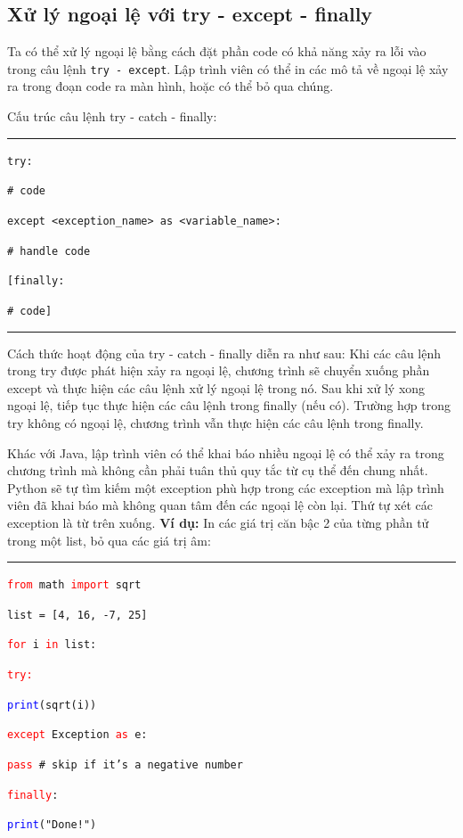 \subsection{Xử lý ngoại lệ với try - except - finally}
Ta có thể xử lý ngoại lệ bằng cách đặt phần code có khả năng xảy ra lỗi vào trong câu lệnh \texttt{try - except}. Lập trình viên có thể in các mô tả về ngoại lệ xảy ra trong đoạn code ra màn hình, hoặc có thể bỏ qua chúng.\par
Cấu trúc câu lệnh try - catch - finally:\par
\rule{\linewidth}{0.2mm}\par
\texttt{try:}\par
\qquad\texttt{\# code}\par
\texttt{except <exception\_name> as <variable\_name>:}\par
\qquad\texttt{\# handle code}\par
\texttt{[finally:}\par
\qquad\texttt{\# code]}\par
\rule{\linewidth}{0.2mm}\par
Cách thức hoạt động của try - catch - finally diễn ra như sau: Khi các câu lệnh trong try được phát hiện xảy ra ngoại lệ, chương trình sẽ chuyển xuống phần except và thực hiện các câu lệnh xử lý ngoại lệ trong nó. Sau khi xử lý xong ngoại lệ, tiếp tục thực hiện các câu lệnh trong finally (nếu có). Trường hợp trong try không có ngoại lệ, chương trình vẫn thực hiện các câu lệnh trong finally.\par
Khác với Java, lập trình viên có thể khai báo nhiều ngoại lệ có thể xảy ra trong chương trình mà không cần phải tuân thủ quy tắc từ cụ thể đến chung nhất. Python sẽ tự tìm kiếm một exception phù hợp trong các exception mà lập trình viên đã khai báo mà không quan tâm đến các ngoại lệ còn lại. Thứ tự xét các exception là từ trên xuống.
\newpage
\textbf{Ví dụ:} In các giá trị căn bậc 2 của từng phần tử trong một list, bỏ qua các giá trị âm:\\
\rule{\linewidth}{0.2mm}\par
\begin{linenumbers}
	\texttt{\textcolor{red}{from} math \textcolor{red}{import} sqrt}\par
	\medskip
	\texttt{list = [4, 16, -7, 25]}\par
	\texttt{\textcolor{red}{for} i \textcolor{red}{in} list:}\par
	\qquad\texttt{\textcolor{red}{try:}}\par
	\qquad\qquad\texttt{\textcolor{blue}{print}(sqrt(i))}\par
	\qquad\texttt{\textcolor{red}{except} Exception \textcolor{red}{as} e:}\par
	\qquad\qquad\texttt{\textcolor{red}{pass} \# skip if it's a negative number}\par
	\qquad\texttt{\textcolor{red}{finally}:}\par
	\qquad\qquad\texttt{\textcolor{blue}{print}("Done!")}\par
\end{linenumbers}
